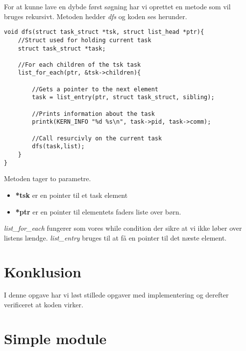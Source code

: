 \documentclass[danish]{report}
\begin{document}
For at kunne lave en dybde først søgning har vi oprettet en metode som vil bruges rekursivt. Metoden hedder \textit{dfs} og koden ses herunder.

\begin{lstlisting}
void dfs(struct task_struct *tsk, struct list_head *ptr){
	//Struct used for holding current task
	struct task_struct *task;
	
	//For each children of the tsk task
	list_for_each(ptr, &tsk->children){ 
	
		//Gets a pointer to the next element
		task = list_entry(ptr, struct task_struct, sibling); 
		
		//Prints information about the task
		printk(KERN_INFO "%d %s\n", task->pid, task->comm);
		
		//Call resurcivly on the current task
		dfs(task,list);
	}
}
\end{lstlisting}

Metoden tager to parametre.

\begin{itemize}
	\item \textbf{*tsk} er en pointer til et task element
	\item \textbf{*ptr} er en pointer til elementets faders liste over børn.
\end{itemize}

\textit{list\_for\_each} fungerer som vores while condition der sikre at vi ikke løber over listens lændge. \textit{list\_entry} bruges til at få en pointer til det næste element.


\vspace{20 mm}\chapter{Konklusion}
I denne opgave har vi løst stillede opgaver med implementering og derefter verificeret at koden virker.
\endgroup
\appendix
\chapter{Simple module}
\label{simple.c}
\end{document}
